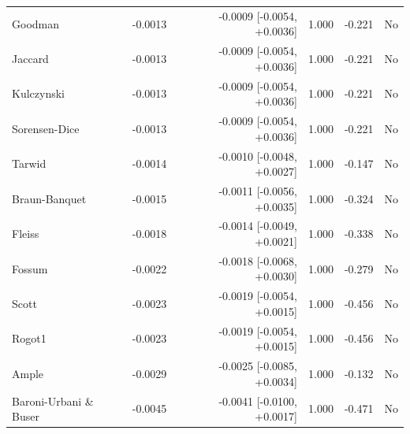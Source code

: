 \begin{table}[t]
{\begin{tabular}{lrrrrr}
Goodman & -0.0013 & -0.0009 [-0.0054, +0.0036] & 1.000 & -0.221 & No \\
Jaccard & -0.0013 & -0.0009 [-0.0054, +0.0036] & 1.000 & -0.221 & No \\
Kulczynski & -0.0013 & -0.0009 [-0.0054, +0.0036] & 1.000 & -0.221 & No \\
Sorensen-Dice & -0.0013 & -0.0009 [-0.0054, +0.0036] & 1.000 & -0.221 & No \\
Tarwid & -0.0014 & -0.0010 [-0.0048, +0.0027] & 1.000 & -0.147 & No \\
Braun-Banquet & -0.0015 & -0.0011 [-0.0056, +0.0035] & 1.000 & -0.324 & No \\
Fleiss & -0.0018 & -0.0014 [-0.0049, +0.0021] & 1.000 & -0.338 & No \\
Fossum & -0.0022 & -0.0018 [-0.0068, +0.0030] & 1.000 & -0.279 & No \\
Scott & -0.0023 & -0.0019 [-0.0054, +0.0015] & 1.000 & -0.456 & No \\
Rogot1 & -0.0023 & -0.0019 [-0.0054, +0.0015] & 1.000 & -0.456 & No \\
Ample & -0.0029 & -0.0025 [-0.0085, +0.0034] & 1.000 & -0.132 & No \\
Baroni-Urbani \& Buser & -0.0045 & -0.0041 [-0.0100, +0.0017] & 1.000 & -0.471 & No \\
\bottomrule
\end{tabular}
}
\end{table}
